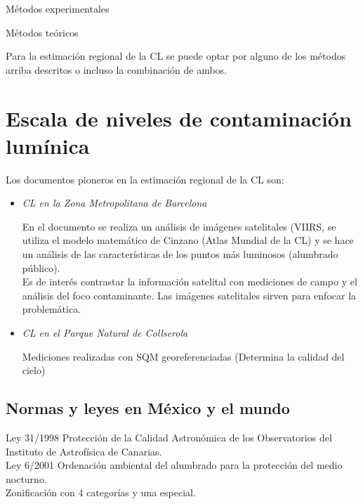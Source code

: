 Métodos experimentales

Métodos teóricos

Para la estimación regional de la CL se puede optar por alguno de los métodos arriba descritos o incluso la combinación de ambos.\\


\section{Escala de niveles de contaminación lumínica}

Los documentos pioneros en la estimación regional de la CL son:

\begin{itemize}

    \item \textit{CL en la Zona Metropolitana de Barcelona}
    
    En el documento se realiza un análisis de imágenes satelitales (VIIRS, se utiliza el modelo matemático de Cinzano (Atlas Mundial de la CL) y se hace un análisis de las características de los puntos más luminosos (alumbrado público).\\
    
    Es de interés contrastar la información satelital con mediciones de campo y el análisis del foco contaminante. Las imágenes satelitales sirven para enfocar la problemática.
    
    \item \textit{CL en el Parque Natural de Collserola}
    
    Mediciones realizadas con SQM georeferenciadas (Determina la calidad del cielo)
    
     
\end{itemize}


\subsection{Normas y leyes en México y el mundo}

Ley 31/1998 Protección de la Calidad Astronómica de los Observatorios del Instituto de Astrofísica de Canarias.\\

Ley 6/2001 Ordenación ambiental del alumbrado para la protección del medio nocturno.\\

Zonificación con 4 categorías y una especial.\\

